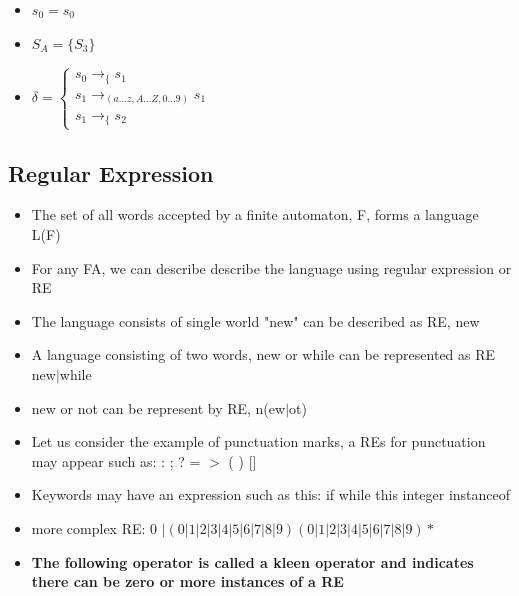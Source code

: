 \documentclass[20pt]{article}
\begin{document}
\begin{itemize}
\begin{itemize}
                    \item $s_0 = s_0 $
                    \item $S_A = \{S_3 \}$
                    \item $\delta = \begin{cases}
                        s_0 \rightarrow_{\{} s_1\\
                        s_1 \rightarrow_{(a...z,A...Z,0...9)} s_1\\
                        s_1 \rightarrow_\{ s_2
                    \end{cases}$
                  \end{itemize}
                  \end{itemize}
    \subsection*{Regular Expression}
                  \begin{itemize} 
                    \item The set of all words accepted by a finite automaton, F, forms a language L(F)
                    \item For any FA, we can describe describe the language using regular expression or RE
                    \item The language consists of single world "new" can be described as RE, new 
                    \newpage
                    \item A language consisting of two words, new or while can be represented as RE new$|$while
                    \item new or not can be represent by RE, n(ew$|$ot)
                    \item Let us consider the example of punctuation marks, a REs for punctuation may appear such as: : ; ? = $>$ ( ) {} []
                    \item Keywords may have an expression such as this: if while this integer instanceof
                    \item more complex RE: 0 $|(0|1|2|3|4|5|6|7|8|9) (0|1|2|3|4|5|6|7|8|9)*$
                    \item \textbf{The following operator is called a kleen operator and indicates there can be zero or more instances of a RE} 
                \end{itemize}
\end{document}
